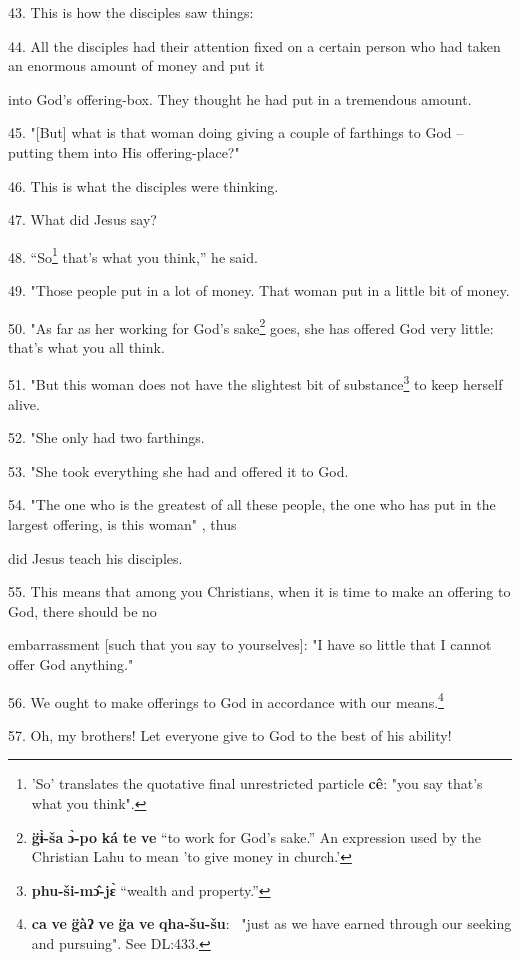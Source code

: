 43. This is how the disciples saw things:

44. All the disciples had their attention fixed on a certain person who had taken
an enormous amount of money and put it

into God's offering-box. They thought he had put in a tremendous amount.

45. "[But] what is that woman doing giving a couple of farthings to God
-- putting them into His offering-place?"

46. This is what the disciples were thinking.

47. What did Jesus say?

48. ``So\footnote{'So' translates the quotative final unrestricted particle \textbf{cê}: "you say that's what you think".} that's what you think,'' he said.

49. "Those people put in a lot of money. That woman put in a little bit
of money.

50. "As far as her working for God's sake\footnote{\textbf{g̈ɨ̀-ša} \textbf{ɔ̀-po} \textbf{ká} \textbf{te} \textbf{ve} ``to work for God's sake.'' An expression used by the Christian Lahu to mean 'to give money in church.'} goes, she has offered God
very little: that's what you all think.

51. "But this woman does not have the slightest bit of substance\footnote{\textbf{phu-ši-mɔ̂-jɛ̀} ``wealth and property.''} to
keep herself alive.

52. "She only had two farthings.

53. "She took everything she had and offered it to God.

54. "The one who is the greatest of all these people, the one who has put
in the largest offering, is this woman" , thus

did Jesus teach his disciples.

55. This means that among you Christians, when it is time to make an offering to
God, there should be no

embarrassment [such that you say to yourselves]: "I have so little that
I cannot offer God anything."

56. We ought to make offerings to God in accordance with our means.\footnote{\textbf{ca} \textbf{ve} \textbf{g̈àʔ} \textbf{ve} \textbf{g̈a} \textbf{ve} \textbf{qha-šu-šu}: ~"just as we have earned through our seeking and pursuing". See DL:433.}

57. Oh, my brothers! Let everyone give to God to the best of his ability!

